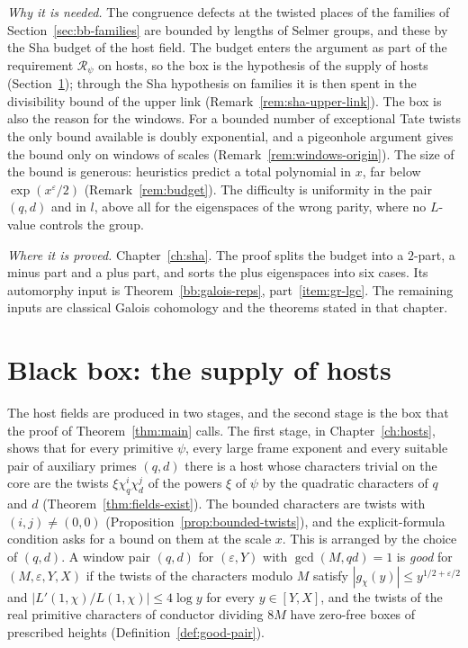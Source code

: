 \documentclass[11pt]{amsbook}
\theoremstyle{plain}
\theoremstyle{definition}
\theoremstyle{remark}
\numberwithin{equation}{section}
\numberwithin{figure}{chapter}
\numberwithin{table}{chapter}
\newcommand{\eps}{\varepsilon}
\begin{document}
\noindent\emph{Why it is needed.} The congruence defects at the
twisted places of the families of Section~\ref{sec:bb-families} are
bounded by lengths of Selmer groups, and these by the Sha budget of
the host field. The budget enters the argument as part of the
requirement $\mathscr R_\psi$ on hosts, so the box is the hypothesis
of the supply of hosts (Section~\ref{sec:bb-hosts}); through the Sha
hypothesis on families it is then spent in the divisibility bound of
the upper link (Remark~\ref{rem:sha-upper-link}). The box is also the
reason for the windows. For a bounded number of exceptional Tate
twists the only bound available is doubly exponential, and a
pigeonhole argument gives the bound only on windows of scales
(Remark~\ref{rem:windows-origin}). The size of the bound is generous:
heuristics predict a total polynomial in $x$, far below
$\exp(x^\eps/2)$ (Remark~\ref{rem:budget}). The difficulty is
uniformity in the pair $(q,d)$ and in $l$, above all for the
eigenspaces of the wrong parity, where no $L$-value controls the
group.

\noindent\emph{Where it is proved.} Chapter~\ref{ch:sha}. The proof
splits the budget into a $2$-part, a minus part and a plus part, and
sorts the plus eigenspaces into six cases. Its automorphy input is
Theorem~\ref{bb:galois-reps}, part~\ref{item:gr-lgc}. The remaining
inputs are classical Galois cohomology and the theorems stated in
that chapter.

\section{Black box: the supply of hosts}
\label{sec:bb-hosts}

The host fields are produced in two stages, and the second stage is
the box that the proof of Theorem~\ref{thm:main} calls. The first
stage, in Chapter~\ref{ch:hosts}, shows that for every primitive
$\psi$, every large frame exponent and every suitable pair of
auxiliary primes $(q,d)$ there is a host whose characters trivial on
the core are the twists $\xi\chi_q^i\chi_d^j$ of the powers $\xi$ of
$\psi$ by the quadratic characters of $q$ and $d$
(Theorem~\ref{thm:fields-exist}). The bounded characters are twists
with $(i,j)\ne(0,0)$ (Proposition~\ref{prop:bounded-twists}), and the
explicit-formula condition asks for a bound on them at the scale
$x$. This is arranged by the choice of $(q,d)$. A window
pair $(q,d)$ for $(\eps,Y)$ with $\gcd(M,qd)=1$ is \emph{good} for
$(M,\eps,Y,X)$ if the twists of the characters modulo $M$ satisfy
$|g_\chi(y)|\le y^{1/2+\eps/2}$ and
$|L'(1,\chi)/L(1,\chi)|\le4\log y$ for every $y\in[Y,X]$, and the
twists of the real primitive characters of conductor dividing $8M$
have zero-free boxes of prescribed heights
(Definition~\ref{def:good-pair}).
\end{document}
